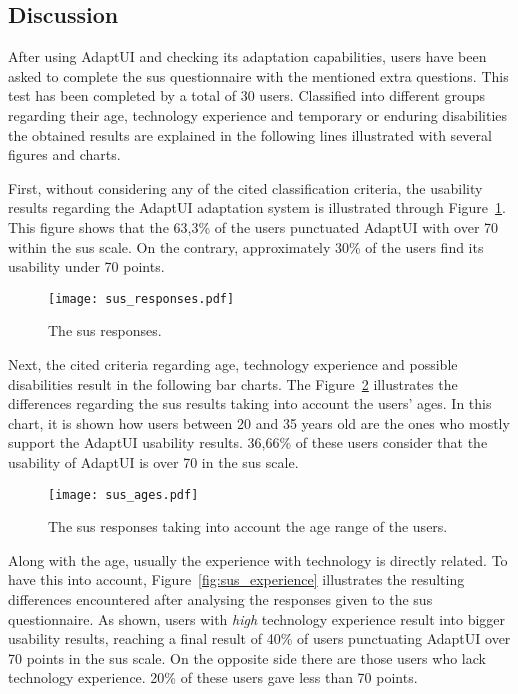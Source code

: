 \subsection{Discussion}
\label{sec:user_evaluation_discussion}

After using AdaptUI and checking its adaptation capabilities, users have been 
asked to complete the \ac{sus} questionnaire with the mentioned extra questions. 
This test has been completed by a total of 30 users. Classified into different 
groups regarding their age, technology experience and temporary or enduring 
disabilities the obtained results are explained in the following lines illustrated 
with several figures and charts.

First, without considering any of the cited classification criteria, the usability 
results regarding the AdaptUI adaptation system is illustrated through 
Figure~\ref{fig:sus_responses}. This figure shows that the 63,3\% of the users
punctuated AdaptUI with over 70 within the \ac{sus} scale. On the contrary, 
approximately 30\% of the users find its usability under 70 points.

\begin{figure}
\centering
\texttt{[image: sus\_responses.pdf]}
\caption{The \ac{sus} responses.}
\label{fig:sus_responses}
\end{figure}

Next, the cited criteria regarding age, technology experience and possible
disabilities result in the following bar charts. The Figure~\ref{fig:sus_age}
illustrates the differences regarding the \ac{sus} results taking into account the
users' ages. In this chart, it is shown how users between 20 and 35 years old
are the ones who mostly support the AdaptUI usability results. 36,66\% of
these users consider that the usability of AdaptUI is over 70 in the \ac{sus} scale.

\begin{figure}
\centering
\texttt{[image: sus\_ages.pdf]}
\caption{The \ac{sus} responses taking into account the age range of the users.}
\label{fig:sus_age}
\end{figure}

Along with the age, usually the experience with technology is directly related.
To have this into account, Figure~\ref{fig:sus_experience} illustrates the
resulting differences encountered after analysing the responses given to the \ac{sus}
questionnaire. As shown, users with \textit{high} technology experience 
result into bigger usability results, reaching a final result of 40\% of 
users punctuating AdaptUI over 70 points in the \ac{sus} scale. On the opposite side 
there are those users who lack technology experience. 20\% of these 
users gave less than 70 points. 

